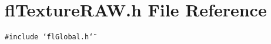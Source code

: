 \section{fl\-Texture\-RAW.h File Reference}
\label{flTextureRAW_8h}
{\tt \#include \char`\"{}fl\-Global.h\char`\"{}}\par

